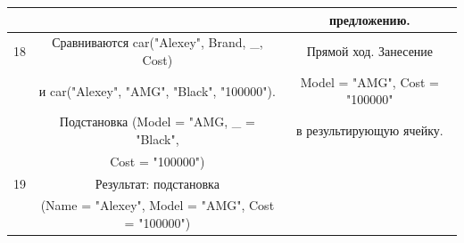 \documentclass[12pt]{report}
\begin{document}
\begin{table}[H]
\begin{center}
\begin{tabular}{|c c c |}
			  &  & предложению. \\
			\hline
			18 & Сравниваются car("Alexey"{}, Brand, \_, Cost) & Прямой ход. Занесение \\
			  & и car("Alexey"{}, "AMG"{}, "Black"{}, "100000"{}). & Model = "AMG"{}, Cost = "100000"{}\\
			  & Подстановка (Model = "AMG, \_ = "Black",  & в результирующую ячейку. \\
			  & Cost = "100000")  & \\
			\hline
			19 & Результат: подстановка & \\
			   & (Name = "Alexey"{}, Model = "AMG"{}, Cost = "100000"{}) & \\
			\hline
		\end{tabular}
	\end{center}
\end{table}
\end{document}
